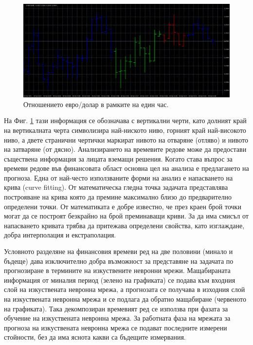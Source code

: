 \documentclass[book,14pt,oneside,openany]{memoir}
\begin{document}
\begin{figure}[h]
  \centering
  \includegraphics[width=1.0\linewidth]{./images/pic0003.png}
  \caption{Отношението евро/долар в рамките на един час.}
\label{fig:pic0003}
\end{figure}

На Фиг. \ref{fig:pic0003} тази информация се обозначава с вертикални черти, като долният край на вертикалната черта символизира най-ниското ниво, горният край най-високото ниво, а двете странични чертички маркират нивото на отваряне (отляво) и нивото на затваряне (от дясно). Анализирането на времевите редове може да предостави съществена информация за лицата вземащи решения. Когато става въпрос за времеви редове във финансовата област основна цел на анализа е предлагането на прогноза. Една от най-често използваните форми на анализ е напасването на крива (curve fitting). От математическа гледна точка задачата представлява построяване на крива която да премине максимално близо до предварително определени точки. От математиката е добре известно, че през краен брой точки могат да се построят безкрайно на брой преминаващи криви. За да има смисъл от напасването кривата трябва да притежава определени свойства, като изглаждане, добра интерполация и екстраполация. 

Условното разделяне на финансовия времеви ред на две половини (минало и бъдеще) дава изключително добра възможност за представяне на задачата по прогнозиране в термините на изкуствените невронни мрежи. Мащабираната информация от миналия период (зелено на графиката) се подава към входния слой на изкуствената невронна мрежа, а прогнозата се получава в изходния слой на изкуствената невронна мрежа и се подлага да обратно мащабиране (червеното на графиката). Така декомпозиран времевият ред се използва при фазата за обучение на изкуствената невронна мрежа. За работната фаза на мрежата за прогноза на изкуствената невронна мрежа се подават последните измерени стойности, без да има яснота какви са бъдещите измервания. 
\end{document}
